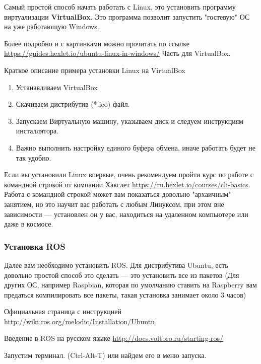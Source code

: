 Самый простой способ начать работать с Linux, это установить программу виртуализации \textbf{VirtualBox}. Это программа позволит запустить "гостевую" ОС на уже работающую Windows.

Более подробно и с картинками можно прочитать по ссылке \url{https://guides.hexlet.io/ubuntu-linux-in-windows/} Часть для VirtualBox.

Краткое описание примера установки Linux на VirtualBox
\begin{enumerate}
    \item Устанавливаем VirtualBox
    \item Скачиваем дистрибутив (*.ico) файл.
    \item Запускаем Виртуальную машину, указываем диск и следуем инструкциям инсталлятора.
    \item Важно выполнить настройку единого буфера обмена, иначе работать будет не так удобно.
\end{enumerate}

Если вы установили Linux впервые, очень рекомендуем пройти курс по работе с командной строкой от компании Хакслет \url{https://ru.hexlet.io/courses/cli-basics}. Работа с командной строкой может вам показаться довольно "архаичным" занятием, но это научит вас работать с любым Линуксом, при этом вне зависимости — установлен он у вас, находиться на удаленном компьютере или даже в космосе.

\subsubsection*{Установка ROS}

Далее вам необходимо установить ROS. Для дистрибутива Ubuntu, есть довольно простой способ это сделать — это установить все из пакетов (Для других ОС, например Raspbian, которая по умолчанию ставить на Raspberry вам предаться компилировать все пакеты, такая установка занимает около 3 часов)

Официальная страница с инструкцией \url{http://wiki.ros.org/melodic/Installation/Ubuntu}

Введение в ROS на русском языке \url{http://docs.voltbro.ru/starting-ros/}

Запустим терминал. (Ctrl-Alt-T) или найдем его в меню запуска.

